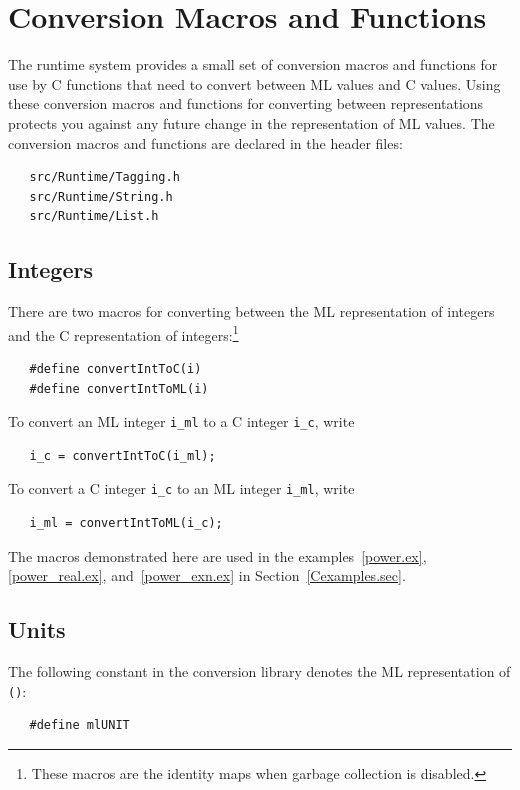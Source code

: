 \documentclass[12pt]{book}
\begin{document}
\section{Conversion Macros and Functions}
The runtime system provides a small set of conversion macros and
functions for use by C functions that need to convert between ML
values and C values. Using these conversion macros and functions for
converting between representations protects you against any future
change in the representation of ML values. The conversion macros and
functions are declared in the header
files:
\begin{verbatim}
   src/Runtime/Tagging.h
   src/Runtime/String.h
   src/Runtime/List.h
\end{verbatim}

\subsection{Integers}
There are two macros for converting between the ML representation of
integers and the C representation of integers:\footnote{These macros are the identity maps when garbage collection is disabled.}
%
%
\begin{verbatim}
   #define convertIntToC(i)
   #define convertIntToML(i)
\end{verbatim}
To convert an ML integer \verb|i_ml| to a C integer \verb|i_c|,
write 
\begin{verbatim}
   i_c = convertIntToC(i_ml);
\end{verbatim}
To convert a C integer \verb|i_c| to an ML
 integer \verb|i_ml|, write
\begin{verbatim}
   i_ml = convertIntToML(i_c);
\end{verbatim}
The macros demonstrated here are used in the examples~\ref{power.ex},
\ref{power_real.ex}, and~\ref{power_exn.ex} in Section~\ref{Cexamples.sec}.

\subsection{Units}
The following constant in the conversion library denotes the ML
representation of {\tt ()}:
%
\begin{verbatim}
   #define mlUNIT
\end{verbatim}
\end{document}
